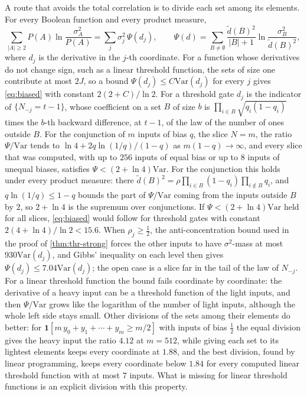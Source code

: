 \documentclass[11pt]{amsart}
\theoremstyle{definition}
\theoremstyle{remark}
\newcommand{\Var}{\mathrm{Var}}
\begin{document}
A route that avoids the total correlation is to divide each set among its elements. For every Boolean function and
every product measure,
\[
\sum_{|A|\ge2}P(A)\ln\frac{\sigma_A^2}{P(A)}=\sum_j\sigma_j^2\,\Psi(d_j),\qquad
\Psi(d)=\sum_{B\ne\emptyset}\frac{\widetilde d(B)^2}{|B|+1}\ln\frac{\sigma_B^2}{\widetilde d(B)^2},
\]
where $d_j$ is the derivative in the $j$-th coordinate. For a function whose derivatives do not change sign, such as
a linear threshold function, the sets of size one contribute at most $2J$, so a bound $\Psi(d_j)\le C\Var(d_j)$ for
every $j$ gives \eqref{eq:biased} with constant $2(2+C)/\ln2$. For a threshold gate $d_j$ is the indicator of $\{N_{-j}=t-1\}$, whose
coefficient on a set $B$ of size $b$ is $\prod_{i\in B}\sqrt{q_i(1-q_i)}$ times the $b$-th backward difference, at
$t-1$, of the law of the number of ones outside $B$. For the conjunction of $m$ inputs of bias $q$, the slice
$N=m$, the ratio $\Psi/\Var$ tends to $\ln4+2q\ln(1/q)/(1-q)$ as $m(1-q)\to\infty$, and every slice that was
computed, with up to $256$ inputs of equal bias or up to $8$ inputs of unequal biases, satisfies
$\Psi<(2+\ln4)\Var$. For the conjunction this holds under every product measure: there
$\widetilde d(B)^2=\rho\prod_{i\in B}(1-q_i)\prod_{i\notin B}q_i$, and $q\ln(1/q)\le1-q$ bounds the part of $\Psi/\Var$
coming from the inputs outside $B$ by $2$, so $2+\ln4$ is the supremum over conjunctions. If $\Psi<(2+\ln4)\Var$ held
for all slices, \eqref{eq:biased} would follow for threshold gates with constant $2(4+\ln4)/\ln2<15.6$. When $\rho_j\ge\frac12$, the anti-concentration bound used in the proof of
\cref{thm:thr-strong} forces the other inputs to have $\sigma^2$-mass at most $930\Var(d_j)$, and Gibbs' inequality
on each level then gives $\Psi(d_j)\le7.04\Var(d_j)$; the open case is a slice far in the tail of the law of $N_{-j}$. For a linear threshold function the bound fails
coordinate by coordinate: the derivative of a heavy input can be a threshold function of the light inputs, and then
$\Psi/\Var$ grows like the logarithm of the number of light inputs, although the whole left side stays small.
Other divisions of the sets among their elements do better: for $\mathbf 1[m\,y_0+y_1+\cdots+y_m\ge m/2]$ with inputs
of bias $\frac12$ the equal division gives the heavy input the ratio $4.12$ at $m=512$, while giving each set to its
lightest elements keeps every coordinate at $1.88$, and the best division, found by linear programming, keeps every
coordinate below $1.84$ for every computed linear threshold function with at most $7$ inputs. What is missing for
linear threshold functions is an explicit division with this property.
\end{document}
